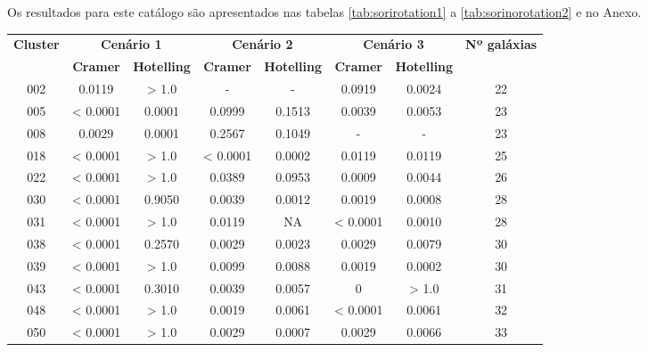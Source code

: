Os resultados para este catálogo são apresentados nas tabelas \ref{tab:sorirotation1} a \ref{tab:sorinorotation2} e no Anexo.

{\scriptsize
\begin{longtable}{cccccccc}
\hline
\multirow{2}{*}{\textbf{Cluster}} & \multicolumn{2}{|c|}{\textbf{Cenário 1}} & \multicolumn{2}{c|}{\textbf{Cenário 2}} & \multicolumn{2}{c|}{\textbf{Cenário 3}} & \multirow{2}{*}{\textbf{Nº galáxias}} \\ \cline{2-7}
                         & \multicolumn{1}{|c}{\textbf{Cramer}}       & \textbf{Hotelling}       & \textbf{Cramer}       & \textbf{Hotelling}       & \textbf{Cramer}       & \textbf{Hotelling}       &                              \\ \hline
002 & {\color{red}0.0119} & > 1.0 & - & - & 0.0919 & {\color{red}0.0024} & 22 \\
005 & {\color{red} < 0.0001} & {\color{red}0.0001} & 0.0999 & 0.1513 & {\color{red}0.0039} & {\color{red}0.0053} & 23 \\
008 & {\color{red}0.0029} & {\color{red}0.0001} & 0.2567 & 0.1049 & - & - & 23 \\
018 & {\color{red} < 0.0001} & > 1.0 & {\color{red} < 0.0001} & {\color{red}0.0002} & {\color{red}0.0119} & {\color{red}0.0119} & 25 \\
022 & {\color{red} < 0.0001} & > 1.0 & {\color{red}0.0389} & 0.0953 & {\color{red}0.0009} & {\color{red}0.0044} & 26 \\
030 & {\color{red} < 0.0001} & 0.9050 & {\color{red}0.0039} & {\color{red}0.0012} & {\color{red}0.0019} & {\color{red}0.0008} & 28 \\
031 & {\color{red} < 0.0001} & > 1.0 & {\color{red}0.0119} & NA & {\color{red} < 0.0001} & {\color{red}0.0010} & 28 \\
038 & {\color{red} < 0.0001} & 0.2570 & {\color{red}0.0029} & {\color{red}0.0023} & {\color{red}0.0029} & {\color{red}0.0079} & 30 \\
039 & {\color{red} < 0.0001} & > 1.0 & {\color{red}0.0099} & {\color{red}0.0088} & {\color{red}0.0019} & {\color{red}0.0002} & 30 \\
043 & {\color{red} < 0.0001} & 0.3010 & {\color{red}0.0039} & {\color{red}0.0057} & {\color{red}0} & > 1.0 & 31 \\
048 & {\color{red} < 0.0001} & > 1.0 & {\color{red}0.0019} & {\color{red}0.0061} & {\color{red} < 0.0001} & {\color{red}0.0061} & 32 \\
050 & {\color{red} < 0.0001} & > 1.0 & {\color{red}0.0029} & {\color{red}0.0007} & {\color{red}0.0029} & {\color{red}0.0066} & 33 \\

\end{longtable}}
